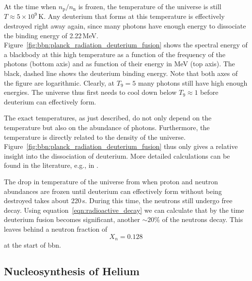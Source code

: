 At the time when $n_\mathrm{p}/n_\mathrm{n}$ is frozen, the temperature of the universe is still $T\approx 5\times 10^{9}$\,K. Any deuterium that forms at this temperature is effectively destroyed right away again, since many photons have enough energy to dissociate the binding energy of 2.22\,MeV. Figure~\ref{fig:bbn:planck_radiation_deuterium_fusion} shows the spectral energy of a blackbody at this high temperature as a function of the frequency of the photons (bottom axis) and as function of their energy in MeV (top axis). The black, dashed line shows the deuterium binding energy. Note that both axes of the figure are logarithmic. Clearly, at $T_9 = 5$ many photons still have high enough energies. The universe thus first needs to cool down below $T_9 \approx 1$ before deuterium can effectively form. 

The exact temperatures, as just described, do not only depend on the temperature but also on the abundance of photons. Furthermore, the temperature is directly related to the density of the universe. Figure~\ref{fig:bbn:planck_radiation_deuterium_fusion} thus only gives a relative insight into the dissociation of deuterium. More detailed calculations can be found in the literature, e.g., in \citet{wagoner67}.

The drop in temperature of the universe from when proton and neutron abundances are frozen until deuterium can effectively form without being destroyed takes about 220\,s. During this time, the neutrons still undergo free decay. Using equation~\eqref{eqn:radioactive_decay} we can calculate that by the time deuterium fusion becomes significant, another $\sim20$\% of the neutrons decay.
This leaves behind a neutron fraction of
\begin{equation}
    X_n = 0.128
\end{equation}
at the start of \ac{bbn}.

\subsection{Nucleosynthesis of Helium}

